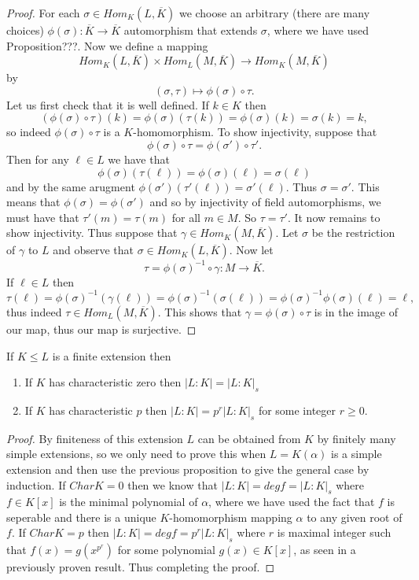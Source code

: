 \documentclass[twoside, a4paper, 10pt]{amsart}
\begin{document}
\begin{proof} For each $\sigma \in Hom_K(L, \overline{K})$ we choose an arbitrary (there are many choices) $\phi(\sigma):\overline{K} \to \overline{K}$ automorphism that extends $\sigma$, where we have used Proposition???. Now we define a mapping $$Hom_K(L, \overline{K}) \times Hom_L(M, \overline{K}) \to Hom_K(M, \overline{K})$$ by $$(\sigma, \tau) \mapsto \phi(\sigma) \circ \tau.$$ Let us first check that it is well defined. If $k \in K$ then $$(\phi(\sigma) \circ \tau) (k) = \phi(\sigma) (\tau(k)) = \phi(\sigma) (k) = \sigma(k) = k,$$ so indeed $\phi(\sigma) \circ \tau$ is a $K$-homomorphism. To show injectivity, suppose that $$\phi(\sigma) \circ \tau = \phi(\sigma') \circ \tau'.$$ Then for any $\ell \in L$ we have that $$\phi(\sigma)(\tau(\ell)) = \phi(\sigma)(\ell) = \sigma(\ell)$$ and by the same arugment $\phi(\sigma')(\tau'(\ell)) = \sigma'(\ell)$. Thus $\sigma = \sigma'$. This means that $\phi(\sigma) = \phi(\sigma')$ and so by injectivity of field automorphisms, we must have that $\tau'(m) = \tau(m)$ for all $m \in M$. So $\tau = \tau'$. It now remains to show injectivity. Thus suppose that $\gamma \in Hom_K(M, \overline{K})$. Let $\sigma$ be the restriction of $\gamma$ to $L$ and observe that $\sigma \in Hom_K(L, \overline{K})$. Now let $$\tau = \phi(\sigma)^{-1} \circ \gamma:M \to \overline{K}.$$ If $\ell \in L$ then $$\tau(\ell) = \phi(\sigma)^{-1}(\gamma(\ell)) = \phi(\sigma)^{-1}(\sigma(\ell)) = \phi(\sigma)^{-1} \phi(\sigma)(\ell) = \ell,$$ thus indeed $\tau \in Hom_L(M, \overline{K})$. This shows that $\gamma = \phi(\sigma) \circ \tau$ is in the image of our map, thus our map is surjective. \end{proof}

\begin{prop}\label{prop: seperable degree prime power} If $K \leq L$ is a finite extension then 
\begin{enumerate}
	\item If $K$ has characteristic zero then $|L:K| = |L:K|_s$
	\item If $K$ has characteristic $p$ then $|L:K| = p^r|L:K|_s$ for some integer $r \geq 0$.
\end{enumerate}
\end{prop}

\begin{proof} By finiteness of this extension $L$ can be obtained from $K$ by finitely many simple extensions, so we only need to prove this when $L = K(\alpha)$ is a simple extension and then use the previous proposition to give the general case by induction. If $Char K = 0$ then we know that $|L:K| = deg f = |L:K|_s$ where $f \in K[x]$ is the minimal polynomial of $\alpha$, where we have used the fact that $f$ is seperable and there is a unique $K$-homomorphism mapping $\alpha$ to any given root of $f$. If $Char K = p$ then $|L:K| = deg f = p^r |L:K|_s$ where $r$ is maximal integer such that $f(x) = g(x^{p^r})$ for some polynomial $g(x) \in K[x]$, as seen in a previously proven result. Thus completing the proof. \end{proof}
\end{document}
